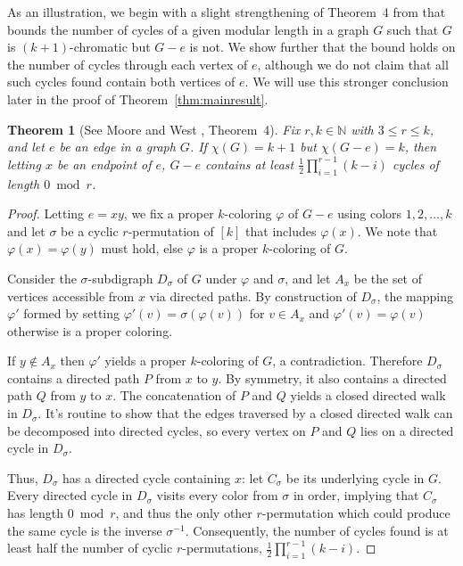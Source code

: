 \documentclass[12pt]{article}
\newtheorem{theorem}{Theorem}
\numberwithin{theorem}{section}
\begin{document}
As an illustration, we begin with a slight strengthening of Theorem~4 from \cite{MW} that bounds the number of cycles of a given modular length in a graph $G$ such that $G$ is $(k+1)$-chromatic but $G-e$ is not.  We show further that the bound holds on the number of cycles through each vertex of $e$, although we do not claim that all such cycles found contain both vertices of $e$.  We will use this stronger conclusion later in the proof of Theorem~\ref{thm:mainresult}.

\begin{theorem}[See Moore and West \cite{MW}, Theorem~4]
    \label{thm:my-cycle}
    Fix $r,k \in \mathbb{N}$ with $3 \le r \le k$, and let $e$ be an edge in a graph $G$.  If $\chi(G)=k+1$ but $\chi(G-e)=k$, then letting $x$ be an endpoint of $e$, $G-e$ contains at least $\frac{1}{2} \prod_{i=1}^{r-1} (k-i)$ cycles of length $0\bmod r$.
\end{theorem}

\begin{proof}
    Letting $e = xy$, we fix a proper $k$-coloring $\varphi$ of $G-e$ using colors $1,2,\ldots,k$ and let $\sigma$ be a cyclic $r$-permutation of $[k]$ that includes $\varphi(x)$. We note that $\varphi(x)=\varphi(y)$ must hold, else $\varphi$ is a proper $k$-coloring of $G$.

    Consider the $\sigma$-subdigraph $D_{\sigma}$ of $G$ under $\varphi$ and $\sigma$, and let $A_x$ be the set of vertices accessible from $x$ via directed paths.  By construction of $D_{\sigma}$, the mapping $\varphi'$ formed by setting $\varphi'(v) = \sigma(\varphi(v))$ for $v \in A_x$ and $\varphi'(v)=\varphi(v)$ otherwise is a proper coloring.

    If $y \notin A_x$ then $\varphi'$ yields a proper $k$-coloring of $G$, a contradiction.  Therefore $D_{\sigma}$ contains a directed path $P$ from $x$ to $y$.  By symmetry, it also contains a directed path $Q$ from $y$ to $x$. The concatenation of $P$ and $Q$ yields a closed directed walk in $D_{\sigma}$. It's routine to show that the edges traversed by a closed directed walk can be decomposed into directed cycles, so every vertex on $P$ and $Q$ lies on a directed cycle in $D_{\sigma}$.

    Thus, $D_{\sigma}$ has a directed cycle containing $x$: let $C_{\sigma}$ be its underlying cycle in $G$.    Every directed cycle in $D_{\sigma}$ visits every color from $\sigma$ in order, implying that $C_{\sigma}$ has length $0\bmod r$, and thus the only other $r$-permutation which could produce the same cycle is the inverse $\sigma^{-1}$.  Consequently, the number of cycles found is at least half the number of cyclic $r$-permutations, $\frac{1}{2}\prod_{i=1}^{r-1} (k-i)$.
\end{proof}
\end{document}
